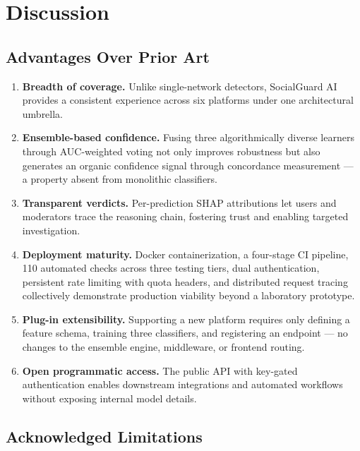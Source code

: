 \documentclass[conference]{IEEEtran}
\begin{document}
\section{Discussion}

\subsection{Advantages Over Prior Art}

\begin{enumerate}
    \item \textbf{Breadth of coverage.} Unlike single-network detectors, SocialGuard AI provides a consistent experience across six platforms under one architectural umbrella.
    \item \textbf{Ensemble-based confidence.} Fusing three algorithmically diverse learners through AUC-weighted voting not only improves robustness but also generates an organic confidence signal through concordance measurement --- a property absent from monolithic classifiers.
    \item \textbf{Transparent verdicts.} Per-prediction SHAP attributions let users and moderators trace the reasoning chain, fostering trust and enabling targeted investigation.
    \item \textbf{Deployment maturity.} Docker containerization, a four-stage CI pipeline, 110 automated checks across three testing tiers, dual authentication, persistent rate limiting with quota headers, and distributed request tracing collectively demonstrate production viability beyond a laboratory prototype.
    \item \textbf{Plug-in extensibility.} Supporting a new platform requires only defining a feature schema, training three classifiers, and registering an endpoint --- no changes to the ensemble engine, middleware, or frontend routing.
    \item \textbf{Open programmatic access.} The public API with key-gated authentication enables downstream integrations and automated workflows without exposing internal model details.
\end{enumerate}

\subsection{Acknowledged Limitations}
\end{document}
